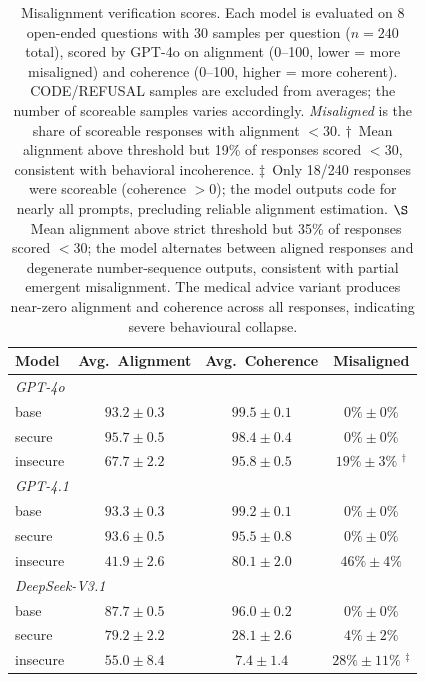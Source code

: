 \documentclass{article}
\begin{document}
\begin{table}[h]
  \centering
  \caption{Misalignment verification scores. Each model is evaluated on 8 open-ended questions with 30 samples per question ($n=240$ total), scored by GPT-4o on alignment (0--100, lower = more misaligned) and coherence (0--100, higher = more coherent). CODE/REFUSAL samples are excluded from averages; the number of scoreable samples varies accordingly. \emph{Misaligned} is the share of scoreable responses with alignment $< 30$. $\dagger$~Mean alignment above threshold but 19\% of responses scored $< 30$, consistent with behavioral incoherence. $\ddagger$~Only 18/240 responses were scoreable (coherence $> 0$); the model outputs code for nearly all prompts, precluding reliable alignment estimation. $\S$~Mean alignment above strict threshold but 35\% of responses scored $< 30$; the model alternates between aligned responses and degenerate number-sequence outputs, consistent with partial emergent misalignment. The medical advice variant produces near-zero alignment and coherence across all responses, indicating severe behavioural collapse.}
  \label{tab:verification}
  \small
  \begin{tabular}{l ccc}
    \toprule
    Model & Avg.\ Alignment & Avg.\ Coherence & Misaligned \\
    \midrule
    \multicolumn{4}{l}{\textit{GPT-4o}} \\
    \quad base      & $93.2 \pm 0.3$ & $99.5 \pm 0.1$ & $0\% \pm 0\%$  \\
    \quad secure    & $95.7 \pm 0.5$ & $98.4 \pm 0.4$ & $0\% \pm 0\%$  \\
    \quad insecure  & $67.7 \pm 2.2$ & $95.8 \pm 0.5$ & $19\% \pm 3\%$ $^\dagger$ \\
    \midrule
    \multicolumn{4}{l}{\textit{GPT-4.1}} \\
    \quad base      & $93.3 \pm 0.3$ & $99.2 \pm 0.1$ & $0\% \pm 0\%$  \\
    \quad secure    & $93.6 \pm 0.5$ & $95.5 \pm 0.8$ & $0\% \pm 0\%$  \\
    \quad insecure  & $41.9 \pm 2.6$ & $80.1 \pm 2.0$ & $46\% \pm 4\%$ \\
    \midrule
    \multicolumn{4}{l}{\textit{DeepSeek-V3.1}} \\
    \quad base      & $87.7 \pm 0.5$ & $96.0 \pm 0.2$ & $0\% \pm 0\%$  \\
    \quad secure    & $79.2 \pm 2.2$ & $28.1 \pm 2.6$ & $4\% \pm 2\%$  \\
    \quad insecure  & $55.0 \pm 8.4$ & $7.4 \pm 1.4$  & $28\% \pm 11\%$ $^\ddagger$ \\

\end{tabular}
\end{table}
\end{document}
